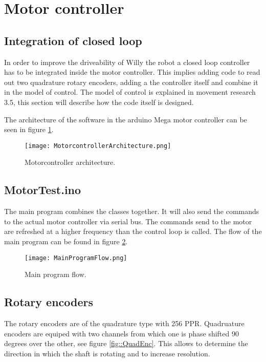 \section{Motor controller}

\subsection{Integration of closed loop}
In order to improve the driveability of Willy the robot a closed loop controller has to be integrated inside the motor controller. 
This implies adding code to read out two quadrature rotary encoders, adding a the controller itself and combine it in the model of control.
The model of control is explained in movement research 3.5, this section will describe how the code itself is designed.

The architecture of the software in the arduino Mega motor controller can be seen in figure \ref{fig::Motorconarc}.

\begin{figure}[H]
\centering
\texttt{[image: MotorcontrollerArchitecture.png]}
\caption{Motorcontroller architecture.}
\label{fig::Motorconarc}
\end{figure}

\subsection{MotorTest.ino}
The main program combines the classes together. It will also send the commands to the actual motor controller via serial bus. The commands send to the motor are refreshed at a higher frequency than the control loop is called. The flow of the main program can be found in figure \ref{fig::MPF}.

\begin{figure}[H]
\centering
\texttt{[image: MainProgramFlow.png]}
\caption{Main program flow.}
\label{fig::MPF}
\end{figure}


\subsection{Rotary encoders}
The rotary encoders are of the quadrature type with 256 PPR. 
Quadruature encoders are equiped with two channels from which one is phase shifted 90 degrees over the other, see figure \ref{fig::QuadEnc}.
This allows to determine the direction in which the shaft is rotating and to increase resolution.

